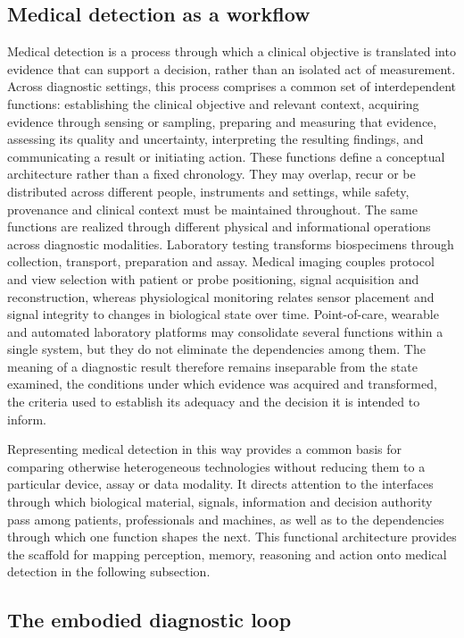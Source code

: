 \documentclass[12pt,a4paper]{article}
\begin{document}
\subsection{Medical detection as a workflow}
\label{subsec:medical_detection_workflow}
Medical detection is a process through which a clinical objective is translated into evidence that can support a decision, rather than an isolated act of measurement. Across diagnostic settings, this process comprises a common set of interdependent functions: establishing the clinical objective and relevant context, acquiring evidence through sensing or sampling, preparing and measuring that evidence, assessing its quality and uncertainty, interpreting the resulting findings, and communicating a result or initiating action. These functions define a conceptual architecture rather than a fixed chronology. They may overlap, recur or be distributed across different people, instruments and settings, while safety, provenance and clinical context must be maintained throughout. The same functions are realized through different physical and informational operations across diagnostic modalities. Laboratory testing transforms biospecimens through collection, transport, preparation and assay. Medical imaging couples protocol and view selection with patient or probe positioning, signal acquisition and reconstruction, whereas physiological monitoring relates sensor placement and signal integrity to changes in biological state over time. Point-of-care, wearable and automated laboratory platforms may consolidate several functions within a single system, but they do not eliminate the dependencies among them. The meaning of a diagnostic result therefore remains inseparable from the state examined, the conditions under which evidence was acquired and transformed, the criteria used to establish its adequacy and the decision it is intended to inform.

Representing medical detection in this way provides a common basis for comparing otherwise heterogeneous technologies without reducing them to a particular device, assay or data modality. It directs attention to the interfaces through which biological material, signals, information and decision authority pass among patients, professionals and machines, as well as to the dependencies through which one function shapes the next. This functional architecture provides the scaffold for mapping perception, memory, reasoning and action onto medical detection in the following subsection.

\subsection{The embodied diagnostic loop}
\label{subsec}
\end{document}
